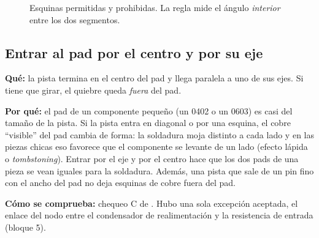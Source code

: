 \begin{figure}[htbp]
\centering
{}
\caption{Esquinas permitidas y prohibidas. La regla mide el ángulo \emph{interior} entre los dos segmentos.}
\label{fig:c09-angulos}
\end{figure}

\subsection{Entrar al pad por el centro y por su eje}

\textbf{Qué:} la pista termina en el centro del pad y llega paralela a uno de sus ejes. Si tiene que girar, el quiebre
queda \emph{fuera} del pad.

\textbf{Por qué:} el pad de un componente pequeño (un 0402 o un 0603) es casi del tamaño de la pista. Si la pista
entra en diagonal o por una esquina, el cobre ``visible'' del pad cambia de forma: la soldadura moja distinto a cada
lado y en las piezas chicas eso favorece que el componente se levante de un lado (efecto lápida o
\emph{tombstoning}). Entrar por el eje y por el centro hace que los dos pads de una pieza se vean iguales para la
soldadura. Además, una pista que sale de un pin fino con el ancho del pad no deja esquinas de cobre fuera del pad.

\textbf{Cómo se comprueba:} chequeo C de . Hubo una sola excepción aceptada, el enlace del
nodo  entre el condensador de realimentación y la resistencia de entrada (bloque 5).


